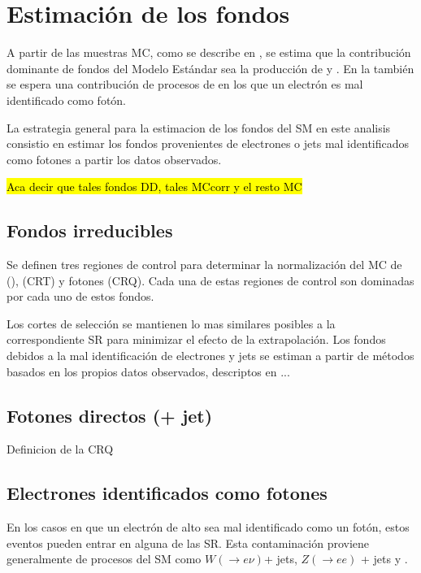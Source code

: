 \chapter{Estimación de los fondos} \label{cap:fondos}


A partir de las muestras MC, como se describe en {\XXX}, se estima que la
contribución dominante de fondos del Modelo Estándar sea la producción de
{\wgam} y {\ttgam}. En la {\SRL} también se espera una contribución de procesos
de {\ttbar} en los que un electrón es mal identificado como fotón.

La estrategia general para la estimacion de los fondos del SM en este analisis
consistio en estimar los fondos provenientes de electrones o jets mal identificados como
fotones a partir los datos observados.

\hl{Aca decir que tales fondos DD, tales MCcorr y el resto MC}







\section{Fondos irreducibles}

Se definen tres regiones de control para determinar la normalización del MC de
{\wgam} ({\CRW}), {\ttgam} ({CRT}) y fotones ({CRQ}). Cada una de estas regiones
de control son dominadas por cada uno de estos fondos.

Los cortes de selección se mantienen lo mas similares posibles a la
correspondiente SR para minimizar el efecto de la extrapolación. Los fondos
debidos a la mal identificación de electrones y jets se estiman a partir de
métodos basados en los propios datos observados, descriptos en ...


\section{Fotones directos (+ jet)}

Definicion de la CRQ

\section{Electrones identificados como fotones} \label{sec:efakes}

En los casos en que un electrón de alto {\pt} sea mal identificado como un
fotón, estos eventos pueden entrar en alguna de las SR. Esta contaminación
proviene generalmente de procesos del SM como $W(\to e\nu)$+ jets, $Z(\to ee)$ +
jets y {\ttbar}.

